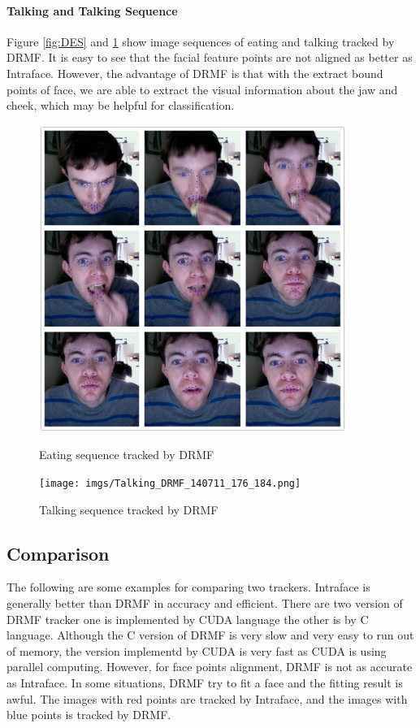 \paragraph{Talking and Talking Sequence}
Figure \ref{fig:DES} and \ref{fig:DTS} show image sequences of eating and talking tracked by DRMF. It is easy to see that the facial feature points are not aligned as better as Intraface. However, the advantage of DRMF is that with the extract bound points of face, we are able to extract the visual information about the jaw and cheek, which may be helpful for classification.
\newpage
\begin{figure}[p]
\centering
\includegraphics[width=100mm]{imgs/Tracking_DRMF_eating.png}
\caption{Eating sequence tracked by DRMF}
\label{fig:DES}
\texttt{[image: imgs/Talking\_DRMF\_140711\_176\_184.png]}
\caption{Talking sequence tracked by DRMF}
\label{fig:DTS}
\end{figure}
\newpage
\subsection{Comparison}
The following are some examples for comparing two trackers. Intraface is generally better than DRMF in accuracy and efficient. There are two version of DRMF tracker one is implemented by CUDA language the other is by C language. Although the C version of DRMF is very slow and very easy to run out of memory, the version implementd by CUDA is very fast as CUDA is using parallel computing. However, for face points alignment, DRMF is not as accurate as Intraface. In some situations, DRMF try to fit a face and the fitting result is awful. The images with red points are tracked by Intraface, and the images with blue points is tracked by DRMF.

